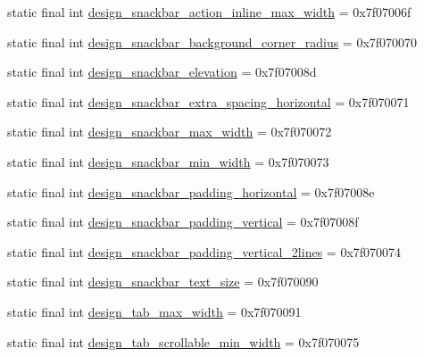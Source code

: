 \begin{CompactItemize}
\item 
static final int \hyperlink{classandroid_1_1support_1_1v7_1_1recyclerview_1_1_r_1_1dimen_4d63774362b84a70eb02f0046fc8e8e0}{design\_\-snackbar\_\-action\_\-inline\_\-max\_\-width} = 0x7f07006f
\item 
static final int \hyperlink{classandroid_1_1support_1_1v7_1_1recyclerview_1_1_r_1_1dimen_0e66b646fef430f10b8b369d67692aac}{design\_\-snackbar\_\-background\_\-corner\_\-radius} = 0x7f070070
\item 
static final int \hyperlink{classandroid_1_1support_1_1v7_1_1recyclerview_1_1_r_1_1dimen_6227e1a95c4ca5894df41a503c4397d7}{design\_\-snackbar\_\-elevation} = 0x7f07008d
\item 
static final int \hyperlink{classandroid_1_1support_1_1v7_1_1recyclerview_1_1_r_1_1dimen_c96333d601dad8d8ba660a87b84a0edc}{design\_\-snackbar\_\-extra\_\-spacing\_\-horizontal} = 0x7f070071
\item 
static final int \hyperlink{classandroid_1_1support_1_1v7_1_1recyclerview_1_1_r_1_1dimen_a92caff2cd256c7ad3aeef0bbb9e8f25}{design\_\-snackbar\_\-max\_\-width} = 0x7f070072
\item 
static final int \hyperlink{classandroid_1_1support_1_1v7_1_1recyclerview_1_1_r_1_1dimen_f265854b5770402604750970ecc453b2}{design\_\-snackbar\_\-min\_\-width} = 0x7f070073
\item 
static final int \hyperlink{classandroid_1_1support_1_1v7_1_1recyclerview_1_1_r_1_1dimen_a12af421baaca05aa963852c6ead0c4b}{design\_\-snackbar\_\-padding\_\-horizontal} = 0x7f07008e
\item 
static final int \hyperlink{classandroid_1_1support_1_1v7_1_1recyclerview_1_1_r_1_1dimen_c1eb6eb56562f200fcf80c412833491e}{design\_\-snackbar\_\-padding\_\-vertical} = 0x7f07008f
\item 
static final int \hyperlink{classandroid_1_1support_1_1v7_1_1recyclerview_1_1_r_1_1dimen_d83c94309e63164e567d712fb1ae5518}{design\_\-snackbar\_\-padding\_\-vertical\_\-2lines} = 0x7f070074
\item 
static final int \hyperlink{classandroid_1_1support_1_1v7_1_1recyclerview_1_1_r_1_1dimen_1778f73baafc131d16319fed13a01378}{design\_\-snackbar\_\-text\_\-size} = 0x7f070090
\item 
static final int \hyperlink{classandroid_1_1support_1_1v7_1_1recyclerview_1_1_r_1_1dimen_2095eaf5b5ac8a23efb87e1b0f777ec1}{design\_\-tab\_\-max\_\-width} = 0x7f070091
\item 
static final int \hyperlink{classandroid_1_1support_1_1v7_1_1recyclerview_1_1_r_1_1dimen_bbedf271e62e221dc6fb49a8ce872b2f}{design\_\-tab\_\-scrollable\_\-min\_\-width} = 0x7f070075

\end{CompactItemize}
